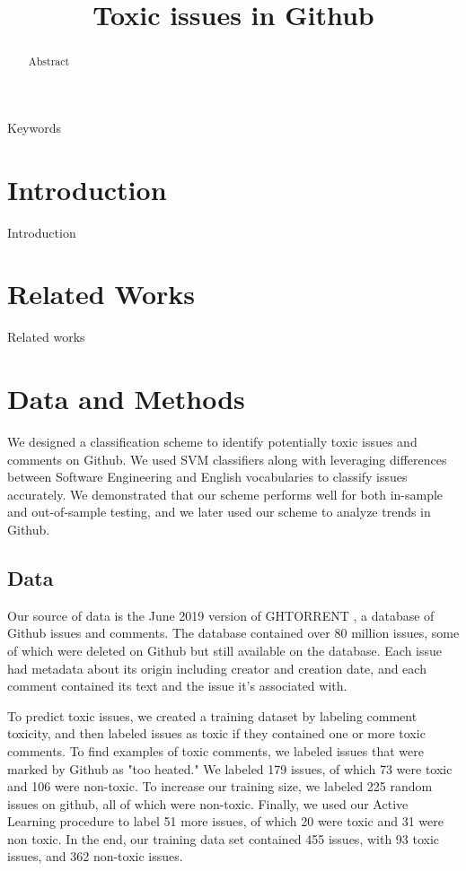 \documentclass[conference]{IEEEtran}
\begin{document}
\title{Toxic issues in Github\\}

\maketitle

\begin{abstract}
Abstract 
\end{abstract}

\begin{IEEEkeywords}
Keywords 
\end{IEEEkeywords}

\section{Introduction}
Introduction
\section{Related Works}
Related works 

\section{Data and Methods}
We designed a classification scheme to identify potentially toxic issues and comments on Github. We used SVM classifiers along with leveraging differences between Software Engineering and English vocabularies to classify issues accurately. We demonstrated that our scheme performs well for both in-sample and out-of-sample testing, and we later used our scheme to analyze trends in Github. 

\subsection{Data}
Our source of data is the June 2019 version of GHTORRENT \cite{b2} , a database of Github issues and comments. The database contained over 80 million issues, some of which were deleted on Github but still available on the database. Each issue had metadata about its origin including creator and creation date, and each comment contained its text and the issue it's associated with. 


To predict toxic issues, we created a training dataset by labeling  comment toxicity, and then labeled issues as toxic if they contained one or more toxic comments. To find examples of toxic comments, we labeled issues that were marked by Github as "too heated." We labeled 179 issues, of which 73 were toxic and 106 were non-toxic. To increase our training size, we labeled 225 random issues on github, all of which were non-toxic. Finally, we used our Active Learning procedure to label 51 more issues, of which 20 were toxic and 31 were non toxic. In the end, our training data set contained 455 issues, with 93 toxic issues, and 362 non-toxic issues. 
\end{document}
